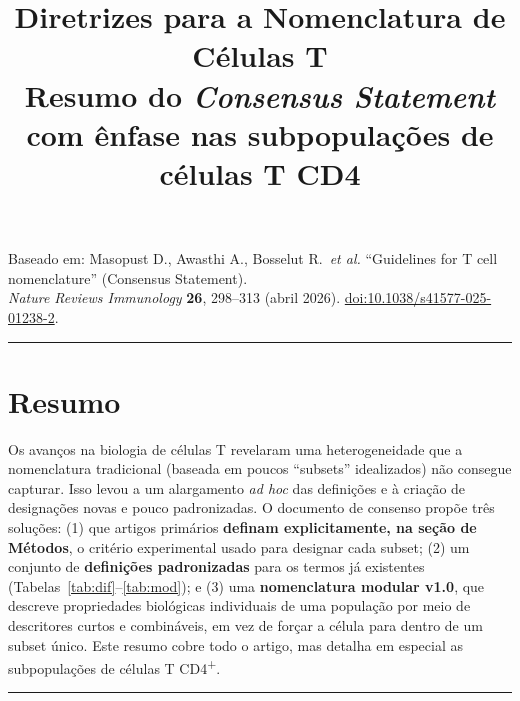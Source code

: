 \documentclass[11pt,a4paper]{article}
\title{\textbf{Diretrizes para a Nomenclatura de Células T}\\[4pt]
\large Resumo do \emph{Consensus Statement} com ênfase nas subpopulações de células T CD4\up{+}}
\author{}
\date{}
\newcommand{\up}[1]{\textsuperscript{#1}}          %
\begin{document}
\maketitle
\vspace{-2.2em}

\begin{center}
\small\color{softgray}
Baseado em: Masopust D., Awasthi A., Bosselut R.\ \emph{et al.}
``Guidelines for T cell nomenclature'' (Consensus Statement).\\
\emph{Nature Reviews Immunology} \textbf{26}, 298--313 (abril 2026).
\href{https://doi.org/10.1038/s41577-025-01238-2}{doi:10.1038/s41577-025-01238-2}.
\end{center}

\vspace{0.5em}
\hrule
\vspace{1em}

\section*{Resumo}
Os avanços na biologia de células T revelaram uma heterogeneidade que a nomenclatura
tradicional (baseada em poucos ``subsets'' idealizados) não consegue capturar. Isso levou a
um alargamento \emph{ad hoc} das definições e à criação de designações novas e pouco
padronizadas. O documento de consenso propõe três soluções: (1) que artigos primários
\textbf{definam explicitamente, na seção de Métodos}, o critério experimental usado para
designar cada subset; (2) um conjunto de \textbf{definições padronizadas} para os termos
já existentes (Tabelas~\ref{tab:dif}--\ref{tab:mod}); e (3) uma \textbf{nomenclatura
modular v1.0}, que descreve propriedades biológicas individuais de uma população por meio
de descritores curtos e combináveis, em vez de forçar a célula para dentro de um subset
único. Este resumo cobre todo o artigo, mas detalha em especial as subpopulações de
células T CD4\up{+}.

\tableofcontents
\vspace{1em}
\hrule

\end{document}

